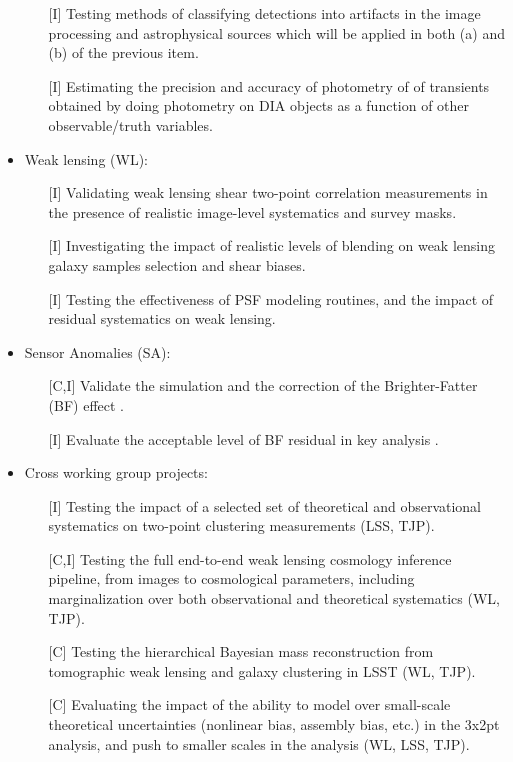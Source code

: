 \documentclass[preprint,times]{aastex61}
\begin{document}
\begin{itemize}
\begin{enumerate}
\item[{[I]}] Testing methods of classifying detections into artifacts in the image processing and astrophysical sources which will be applied in both (a) and (b) of the previous item.
\item[{[I]}] Estimating the precision and accuracy of photometry of of transients obtained by doing photometry on DIA objects as a function of other observable/truth variables.
\end{enumerate}
\item Weak lensing (WL):
\begin{enumerate}
\item[{[I]}] Validating weak lensing shear two-point correlation measurements in the presence of realistic image-level systematics and survey masks.
\item[{[I]}] Investigating the impact of realistic levels of blending on weak lensing galaxy samples selection and shear biases.
\item[{[I]}] Testing the effectiveness of PSF modeling routines, and the impact of residual systematics on weak lensing.
\end{enumerate}
\item Sensor Anomalies (SA):
\begin{enumerate}
\item[{[C,I]}] Validate the simulation and the  correction of the Brighter-Fatter (BF)  effect .
\item[{[I]}]  Evaluate the acceptable level of  BF residual in key analysis . 
\end{enumerate}
\item Cross working group projects:
\begin{enumerate}
\item[{[I]}] Testing the impact of a selected set of theoretical and observational systematics on
  two-point clustering measurements (LSS, TJP).
\item[{[C,I]}] Testing the full end-to-end weak lensing cosmology inference pipeline, from images to
  cosmological parameters, including marginalization over both observational and theoretical
  systematics (WL, TJP).
\item[{[C]}] Testing the hierarchical Bayesian mass reconstruction from tomographic weak lensing and
  galaxy clustering in LSST (WL, TJP).
\item[{[C]}] Evaluating the impact of the ability to model over small-scale theoretical
  uncertainties (nonlinear bias, assembly bias, etc.) in the 3x2pt analysis, and push to smaller
  scales in the analysis (WL, LSS, TJP).
\end{enumerate}
\end{itemize}
\end{document}
